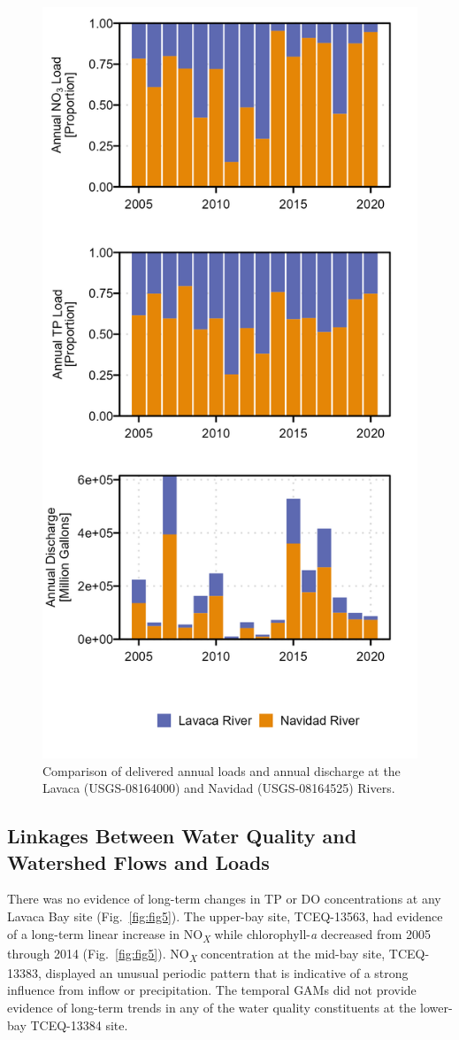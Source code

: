 \documentclass[fleqn,10pt,lineno]{wlpeerj} %
\begin{document}
\begin{figure}

{\centering \includegraphics[width=0.5\linewidth,]{Schramm-2023-06-PeerJ_files/figure-latex/fig4-1} 

}

\caption{Comparison of delivered annual loads and annual discharge at the Lavaca (USGS-08164000) and Navidad (USGS-08164525) Rivers.}\label{fig:fig4}
\end{figure}

\hypertarget{linkages-between-water-quality-and-watershed-flows-and-loads}{%
\subsection*{Linkages Between Water Quality and Watershed Flows and
Loads}\label{linkages-between-water-quality-and-watershed-flows-and-loads}}

There was no evidence of long-term changes in TP or DO concentrations at
any Lavaca Bay site (Fig.~\ref{fig:fig5}). The upper-bay site,
TCEQ-13563, had evidence of a long-term linear increase in
NO\textsubscript{\emph{X}} while chlorophyll-\emph{a} decreased from
2005 through 2014 (Fig.~\ref{fig:fig5}). NO\textsubscript{\emph{X}}
concentration at the mid-bay site, TCEQ-13383, displayed an unusual
periodic pattern that is indicative of a strong influence from inflow or
precipitation. The temporal GAMs did not provide evidence of long-term
trends in any of the water quality constituents at the lower-bay
TCEQ-13384 site.
\end{document}
